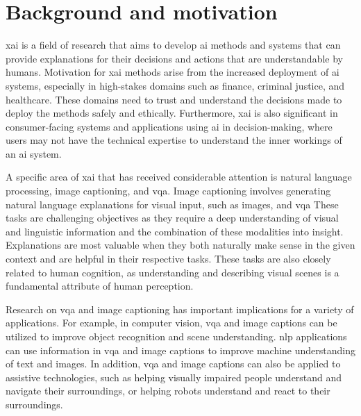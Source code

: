 \label{sec:1_1_background_and_motivation}

\begin{comment}
In about a page, summarize the most important background information. The text usually leads to YOUR PROBLEM STATEMENT (in the next section) and gives arguments about why this is a challenge today.
\end{comment}

\section{Background and motivation}

\gls{xai} is a field of research that aims to develop \gls{ai} methods and systems that can provide explanations for their decisions and actions that are understandable by humans. Motivation for \gls{xai} methods arise from the increased deployment of \gls{ai} systems, especially in high-stakes domains such as finance, criminal justice, and healthcare. These domains need to trust and understand the decisions made to deploy the methods safely and ethically. Furthermore, \gls{xai} is also significant in consumer-facing systems and applications using \gls{ai} in decision-making, where users may not have the technical expertise to understand the inner workings of an \gls{ai} system.

A specific area of \gls{xai} that has received considerable attention is natural language processing, image captioning\cite{vinyalsShowTellNeural2015, youImageCaptioningSemantic2016, vinyalsShowTellLessons2017}, and \gls{vqa}. Image captioning involves generating natural language explanations for visual input, such as images, and \gls{vqa} 
These tasks are challenging objectives as they require a deep understanding of visual and linguistic information and the combination of these modalities into insight. Explanations are most valuable when they both naturally make sense in the given context and are helpful in their respective tasks. These tasks are also closely related to human cognition, as understanding and describing visual scenes is a fundamental attribute of human perception. 

Research on \gls{vqa} and image captioning has important implications for a variety of applications. For example, in computer vision, \gls{vqa} and image captions can be utilized to improve object recognition and scene understanding. \gls{nlp} applications can use information in \gls{vqa} and image captions to improve machine understanding of text and images. 
In addition, \gls{vqa} and image captions can also be applied to assistive technologies, such as helping visually impaired people understand and navigate their surroundings, or helping robots understand and react to their surroundings.

